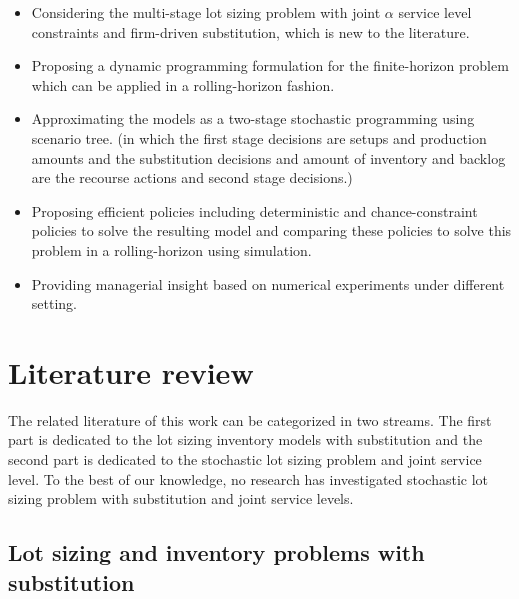 \documentclass[10pt]{article}
\begin{document}
    
\begin{itemize}
\item Considering the multi-stage lot sizing problem with joint $\alpha$ service level constraints and firm-driven substitution, which is new to the literature.

\item Proposing a dynamic programming formulation for the finite-horizon problem which can be applied in a rolling-horizon fashion.
\item Approximating the models as a two-stage stochastic programming using scenario tree. (in which the first stage decisions are setups and production amounts and the substitution decisions and amount of inventory and backlog are the recourse actions and second stage decisions.)
\item Proposing efficient policies including deterministic and chance-constraint policies to solve the resulting model and comparing these policies to solve this problem in a rolling-horizon using simulation.
    \item Providing managerial insight based on numerical experiments under different setting.%
    


\end{itemize}

\section{Literature review}
The related literature of this work can be categorized in two streams. The first part is dedicated to the lot sizing inventory models with substitution and the second part is dedicated to the stochastic lot sizing problem and joint service level. To the best of our knowledge, no research has investigated stochastic lot sizing problem with substitution and joint service levels.

\subsection{Lot sizing and inventory problems with substitution}
\end{document}
